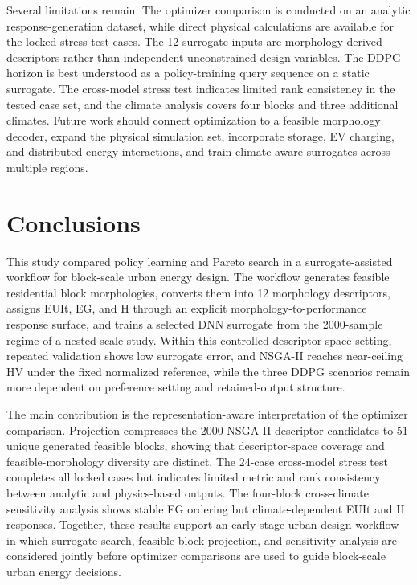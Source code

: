 \documentclass[final,3p,times,numbers,sort&compress]{elsarticle}
\begin{document}
Several limitations remain. The optimizer comparison is conducted on an analytic response-generation dataset, while direct physical calculations are available for the locked stress-test cases. The 12 surrogate inputs are morphology-derived descriptors rather than independent unconstrained design variables. The DDPG horizon is best understood as a policy-training query sequence on a static surrogate. The cross-model stress test indicates limited rank consistency in the tested case set, and the climate analysis covers four blocks and three additional climates. Future work should connect optimization to a feasible morphology decoder, expand the physical simulation set, incorporate storage, EV charging, and distributed-energy interactions, and train climate-aware surrogates across multiple regions.

\section{Conclusions}
\label{sec:conclusions}

This study compared policy learning and Pareto search in a surrogate-assisted workflow for block-scale urban energy design. The workflow generates feasible residential block morphologies, converts them into 12 morphology descriptors, assigns EUIt, EG, and H through an explicit morphology-to-performance response surface, and trains a selected DNN surrogate from the 2000-sample regime of a nested scale study. Within this controlled descriptor-space setting, repeated validation shows low surrogate error, and NSGA-II reaches near-ceiling HV under the fixed normalized reference, while the three DDPG scenarios remain more dependent on preference setting and retained-output structure.

The main contribution is the representation-aware interpretation of the optimizer comparison. Projection compresses the 2000 NSGA-II descriptor candidates to 51 unique generated feasible blocks, showing that descriptor-space coverage and feasible-morphology diversity are distinct. The 24-case cross-model stress test completes all locked cases but indicates limited metric and rank consistency between analytic and physics-based outputs. The four-block cross-climate sensitivity analysis shows stable EG ordering but climate-dependent EUIt and H responses. Together, these results support an early-stage urban design workflow in which surrogate search, feasible-block projection, and sensitivity analysis are considered jointly before optimizer comparisons are used to guide block-scale urban energy decisions.
\end{document}
